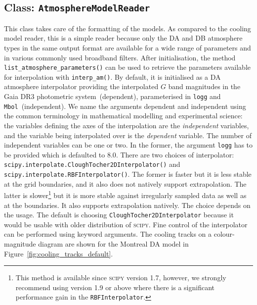 \documentclass[fleqn,usenatbib]{rasti}
\begin{document}
\subsection{Class: \texttt{AtmosphereModelReader}}
This class takes care of the formatting of the models. As compared to the
cooling model reader, this is a simple reader because only the DA and DB
atmosphere types in the same output format are available for a wide range of
parameters and in various commonly used broadband filters. After initialisation,
the method \texttt{list\_atmosphere\_parameters()} can be used to retrieve the
parameters available for interpolation with \texttt{interp\_am()}. By default, it
is initialised as a DA atmosphere interpolator providing the interpolated $G$
band magnitudes in the Gaia DR3 photometric system~(dependent), parameterised
in \texttt{logg} and \texttt{Mbol}~(independent). We name the arguments dependent
and independent using the common terminology in mathematical modelling and
experimental science: the variables defining the axes of the interpolation are
the \textit{independent} variables, and the variable being interpolated over
is the \textit{dependent} variable. The number of independent variables can be
one or two. In the former, the argument \texttt{logg} has to be provided which
is defaulted to $8.0$. There are two choices of interpolator:
\texttt{scipy.interpolate.CloughTocher2DInterpolator()} and 
\texttt{scipy.interpolate.RBFInterpolator()}. The former is faster but it is less
stable at the grid boundaries, and it also does not
natively support extrapolation. The
latter is slower\footnote{This method is available since \textsc{scipy}
version 1.7, however, we strongly recommend using version 1.9 or above where
there is a significant performance gain in the \texttt{RBFInterpolator}.} but it is more
stable against irregularly sampled data as well as at the boundaries. It also
supports extrapolation natively. The choice depends on the usage. The
default is choosing \texttt{CloughTocher2DInterpolator} because
it would be usable with older distribution of \textsc{scipy}. Fine control
of the interpolator can be performed using keyword arguments. The cooling
tracks on a colour-magnitude diagram are shown for the Montreal DA model
in Figure~\ref{fig:cooling_tracks_default}.
\end{document}

